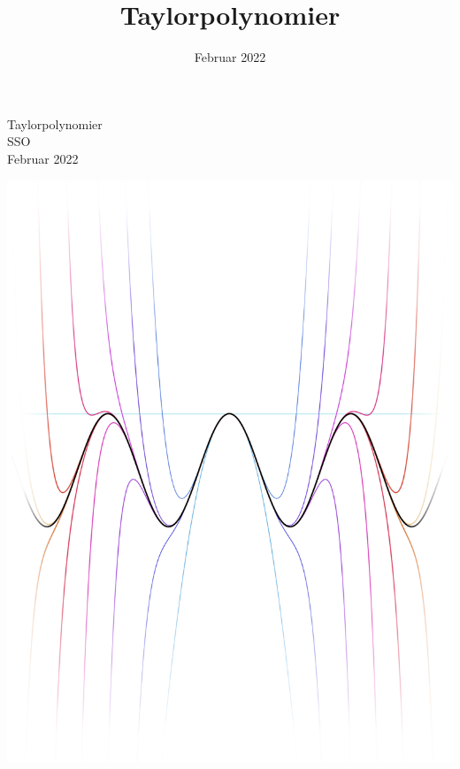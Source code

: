 \documentclass[12pt, a4paper]{article}
\title{Taylorpolynomier}
\date{Februar 2022}
\begin{document}
\begin{titlepage}
   \centering
    \vfill
    {\huge 
    Taylorpolynomier\\
    \vspace{0.5cm}
    \large
    SSO\\
    \vspace{0.25cm}
    Februar 2022
    }    
    \vfill
   
    \includegraphics[width=\textwidth]{figures/forside4edit.png} %
    \vfill
    \vfill
\thispagestyle{empty}

\end{titlepage}
\end{document}
